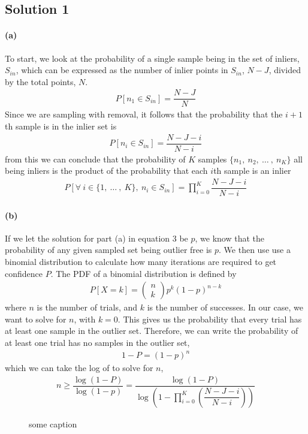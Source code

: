 \documentclass{article}
\newcommand{\solution}[1]{\clearpage \subsection*{Solution #1}}
\newcommand{\spart}[1]{\paragraph{(#1)}}
\begin{document}

\solution{1} 

\spart{a} To start, we look at the probability of a single sample being in the set of inliers, 
$S_{in}$, which can be expressed as the number of inlier points in $S_{in}$, $N-J$, divided by the total points, $N$.
\begin{align}
	P[n_1 \in S_{in}] = \dfrac{N-J}{N}
\end{align}
Since we are sampling with removal, it follows that the probability that the $i+1$th sample is in the inlier set is
\begin{align}
	P[n_i \in S_{in}] = \dfrac{N-J-i}{N-i}
\end{align}
from this we can conclude that the probability of $K$ samples $\{n_1,\ n_2,\ \dots\ ,\ n_K\}$ all being inliers is the product of the probability that each $i$th sample is an inlier 
\begin{align}
	P[\forall\  i \in \{1, \ \dots \ ,\ K\},\  n_i \in S_{in}] = \prod_{i=0}^{K} \dfrac{N-J-i}{N-i}
\end{align}

\spart{b} If we let the solution for part (a) in equation 3 be $p$, we know that the probability of any given sampled set being outlier free is $p$. We then use use a binomial distribution to calculate how many iterations are required to get confidence $P$. The PDF of a binomial distribution is defined by
\begin{align}
	P[X=k] = \begin{pmatrix} n \\ k \end{pmatrix} p^k(1-p)^{n-k}
\end{align}
where $n$ is the number of trials, and $k$ is the number of successes. In our case, we want to solve for $n$, with $k=0$. This gives us the probability that every trial has at least one sample in the outlier set. Therefore, we can write the probability of at least one trial has no samples in the outlier set,
\begin{align}
	1-P = (1-p)^{n}
\end{align}
which we can take the log of to solve for $n$,
\begin{align}
	n \geq \dfrac{\log(1-P)}{\log(1-p)} = \dfrac{\log(1-P)}{\log\left(1-\prod_{i=0}^{K} \left(\dfrac{N-J-i}{N-i}\right)\right)}
\end{align}
\begin{figure*}[!h]
  \centering
  \caption{some caption}
  \label{fig:lab}
\end{figure*}
\end{document}
